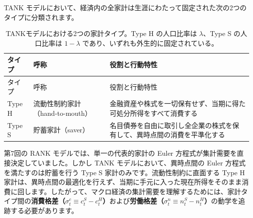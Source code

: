 \documentclass[
  japanese,
  lualatex,
  ja=standard,
  12pt,
  a4paper]{ltjsarticle}
\begin{document}
TANK
モデルにおいて、経済内の全家計は生涯にわたって固定された次の2つのタイプに分類されます。

\begin{longtable}[]{@{}
  >{\raggedright\arraybackslash}p{}
  >{\raggedright\arraybackslash}p{}
  >{\raggedright\arraybackslash}p{}@{}}
\caption{TANKモデルにおける2つの家計タイプ。Type H の人口比率は
\(\lambda\)、Type S の人口比率は \(1-\lambda\)
であり、いずれも外生的に固定されている。}\tabularnewline
\toprule\noalign{}
\begin{minipage}[b]{\linewidth}\raggedright
タイプ
\end{minipage} & \begin{minipage}[b]{\linewidth}\raggedright
呼称
\end{minipage} & \begin{minipage}[b]{\linewidth}\raggedright
役割と行動特性
\end{minipage} \\
\midrule\noalign{}
\endfirsthead
\toprule\noalign{}
\begin{minipage}[b]{\linewidth}\raggedright
タイプ
\end{minipage} & \begin{minipage}[b]{\linewidth}\raggedright
呼称
\end{minipage} & \begin{minipage}[b]{\linewidth}\raggedright
役割と行動特性
\end{minipage} \\
\midrule\noalign{}
\endhead
\bottomrule\noalign{}
\endlastfoot
Type H & 流動性制約家計（hand-to-mouth） &
金融資産や株式を一切保有せず、当期に得た可処分所得をすべて消費する \\
Type S & 貯蓄家計（saver） &
名目債券を自由に取引し全企業の株式を保有して、異時点間の消費を平準化する \\
\end{longtable}

第7回の RANK モデルでは、単一の代表的家計の Euler
方程式が集計需要を直接決定していました。しかし TANK
モデルにおいて、異時点間の Euler 方程式を満たすのは貯蓄を行う Type S
家計のみです。流動性制約に直面する Type H
家計は、異時点間の最適化を行えず、当期に手元に入った現在所得をそのまま消費に回します。したがって、マクロ経済の集計需要を理解するためには、家計タイプ間の\textbf{消費格差（\(\sigma_t^c \equiv c_t^S - c_t^H\)）}および\textbf{労働格差（\(\sigma_t^n \equiv n_t^S - n_t^H\)）}の動学を追跡する必要があります。
\end{document}
